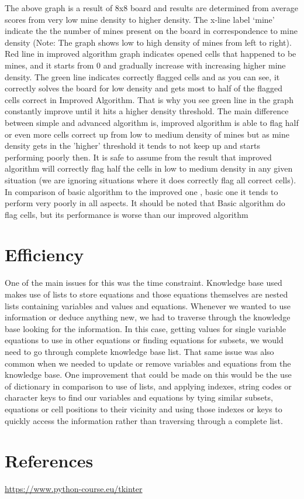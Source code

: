 \documentclass{article}
\begin{document}
The above graph is a result of 8x8 board and results are determined from average scores from very low mine density to higher density. The x-line label ‘mine’ indicate the the number of mines present on the board in correspondence to mine density (Note:  The graph shows  low to high density of mines from left to right).
Red line in improved algorithm graph indicates opened cells that happened to be mines, and it starts from 0 and gradually increase with increasing higher mine density. The green line indicates correctly flagged cells and as you can see, it correctly solves the board for low density and gets most to half of the flagged cells correct in Improved Algorithm. That is why you see green line in the graph constantly improve until it hits a higher density threshold. The main difference between simple and advanced algorithm is, improved algorithm is able to flag half or even more cells correct up from low to medium density of mines but as mine density gets in the 'higher' threshold it tends to not keep up and starts performing poorly then. It is safe to assume from the result that  improved algorithm will correctly flag half the cells in low to medium density in any given situation (we are ignoring situations where it does correctly flag all correct cells). In comparison of basic algorithm to the improved one , basic one it tends to perform very poorly in all aspects. It should be noted that Basic algorithm do flag cells, but its performance is worse than our improved algorithm

\section{Efficiency}
One of the main issues for this was the time constraint. Knowledge base used makes use of lists to store equations and those equations themselves are nested lists containing variables and values and equations. Whenever we wanted to use information or deduce anything new, we had to traverse through the knowledge base looking for the information. In this case, getting values for single variable equations to use in other equations or finding equations for subsets, we would need to go through complete knowledge base list. That same issue was also common when we needed to update or remove variables and equations from the knowledge base. One improvement that could be made on this would be the use of dictionary in comparison to use of lists, and applying indexes, string codes or character keys to find our variables and equations by tying similar subsets, equations or cell positions to their vicinity and using those indexes or keys to quickly access the information rather than traversing through a complete list.
 
 \newpage
\section{References}
\url{https://www.python-course.eu/tkinter}
\end{document}
